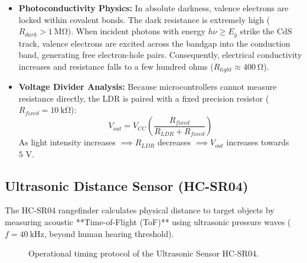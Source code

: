 \begin{itemize}
    \item \textbf{Photoconductivity Physics:}
    In absolute darkness, valence electrons are locked within covalent bonds. The dark resistance is extremely high ($R_{dark} > \SI{1}{\mega\ohm}$). When incident photons with energy $h\nu \ge E_g$ strike the CdS track, valence electrons are excited across the bandgap into the conduction band, generating free electron-hole pairs. Consequently, electrical conductivity increases and resistance falls to a few hundred ohms ($R_{light} \approx \SI{400}{\ohm}$).
    \item \textbf{Voltage Divider Analysis:}
    Because microcontrollers cannot measure resistance directly, the LDR is paired with a fixed precision resistor ($R_{fixed} = \SI{10}{\kilo\ohm}$):
    \begin{equation}
        V_{out} = V_{CC} \left( \frac{R_{fixed}}{R_{LDR} + R_{fixed}} \right)
    \end{equation}
    As light intensity increases $\implies R_{LDR}$ decreases $\implies V_{out}$ increases towards $5\text{ V}$.
\end{itemize}

\subsection{Ultrasonic Distance Sensor (HC-SR04)}
The HC-SR04 rangefinder calculates physical distance to target objects by measuring acoustic **Time-of-Flight (ToF)** using ultrasonic pressure waves ($f = \SI{40}{\kilo\hertz}$, beyond human hearing threshold).

\begin{figure}[htbp]
\centering
{}
\caption{Operational timing protocol of the Ultrasonic Sensor HC-SR04.}
\label{fig:ultrasonic-timing}
\end{figure}

